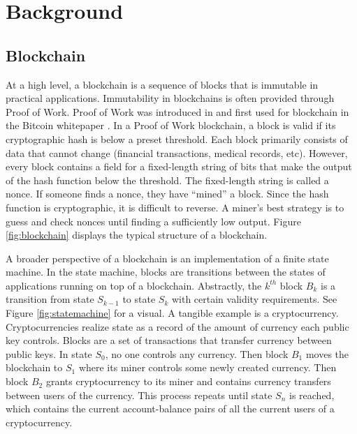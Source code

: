 \section{Background}
\label{sec:background}

\subsection{Blockchain}

At a high level, a blockchain is a sequence of blocks that is immutable in practical applications.
Immutability in blockchains is often provided through Proof of Work.
Proof of Work was introduced in \cite{dwork1992PoW} and first used for blockchain in the Bitcoin whitepaper \cite{nakamoto2009Bitcoin}.
In a Proof of Work blockchain, a block is valid if its cryptographic hash is below a preset threshold.
Each block primarily consists of data that cannot change (financial transactions, medical records, etc).
However, every block contains a field for a fixed-length string of bits that make the output of the hash function below the threshold.
The fixed-length string is called a nonce.
If someone finds a nonce, they have ``mined'' a block.
Since the hash function is cryptographic, it is difficult to reverse.
A miner's best strategy is to guess and check nonces until finding a sufficiently low output.
Figure \ref{fig:blockchain} displays the typical structure of a blockchain.



A broader perspective of a blockchain is an implementation of a finite state machine.
In the state machine, blocks are transitions between the states of applications running on top of a blockchain.
Abstractly, the $k^{th}$ block $B_k$ is a transition from state $S_{k-1}$ to state $S_k$ with certain validity requirements.
See Figure \ref{fig:statemachine} for a visual.
A tangible example is a cryptocurrency.
Cryptocurrencies realize state as a record of the amount of currency each public key controls.
Blocks are a set of transactions that transfer currency between public keys.
In state $S_0$, no one controls any currency.
Then block $B_1$ moves the blockchain to $S_1$ where its miner controls some newly created currency.
Then block $B_2$ grants cryptocurrency to its miner and contains currency transfers between users of the currency.
This process repeats until state $S_n$ is reached, which contains the current account-balance pairs of all the current users of a cryptocurrency.



